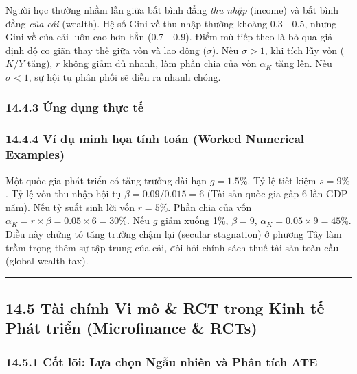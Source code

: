 \documentclass[
]{article}
\begin{document}
Người học thường nhầm lẫn giữa bất bình đẳng \emph{thu nhập} (income) và
bất bình đẳng \emph{của cải} (wealth). Hệ số Gini về thu nhập thường
khoảng 0.3 - 0.5, nhưng Gini về của cải luôn cao hơn hẳn (0.7 - 0.9).
Điểm mù tiếp theo là bỏ qua giả định độ co giãn thay thế giữa vốn và lao
động (\(\sigma\)). Nếu \(\sigma > 1\), khi tích lũy vốn (\(K/Y\) tăng),
\(r\) không giảm đủ nhanh, làm phần chia của vốn \(\alpha_K\) tăng lên.
Nếu \(\sigma < 1\), sự hội tụ phân phối sẽ diễn ra nhanh chóng.

\subsubsection{14.4.3 Ứng dụng thực
tế}\label{ux1ee9ng-dux1ee5ng-thux1ef1c-tux1ebf-3}

\subsubsection{14.4.4 Ví dụ minh họa tính toán (Worked Numerical
Examples)}\label{vuxed-dux1ee5-minh-hux1ecda-tuxednh-touxe1n-worked-numerical-examples-41}

Một quốc gia phát triển có tăng trưởng dài hạn \(g = 1.5\%\). Tỷ lệ tiết
kiệm \(s = 9\%\). Tỷ lệ vốn-thu nhập hội tụ \(\beta = 0.09 / 0.015 = 6\)
(Tài sản quốc gia gấp 6 lần GDP năm). Nếu tỷ suất sinh lời vốn
\(r = 5\%\). Phần chia của vốn
\(\alpha_K = r \times \beta = 0.05 \times 6 = 30\%\). Nếu \(g\) giảm
xuống 1\%, \(\beta = 9\), \(\alpha_K = 0.05 \times 9 = 45\%\). Điều này
chứng tỏ tăng trưởng chậm lại (secular stagnation) ở phương Tây làm trầm
trọng thêm sự tập trung của cải, đòi hỏi chính sách thuế tài sản toàn
cầu (global wealth tax).

\begin{center}\rule{0.5\linewidth}{0.5pt}\end{center}

\subsection{14.5 Tài chính Vi mô \& RCT trong Kinh tế Phát triển
(Microfinance \&
RCTs)}\label{tuxe0i-chuxednh-vi-muxf4-rct-trong-kinh-tux1ebf-phuxe1t-triux1ec3n-microfinance-rcts}

\subsubsection{14.5.1 Cốt lõi: Lựa chọn Ngẫu nhiên và Phân tích
ATE}\label{cux1ed1t-luxf5i-lux1ef1a-chux1ecdn-ngux1eabu-nhiuxean-vuxe0-phuxe2n-tuxedch-ate}
\end{document}
